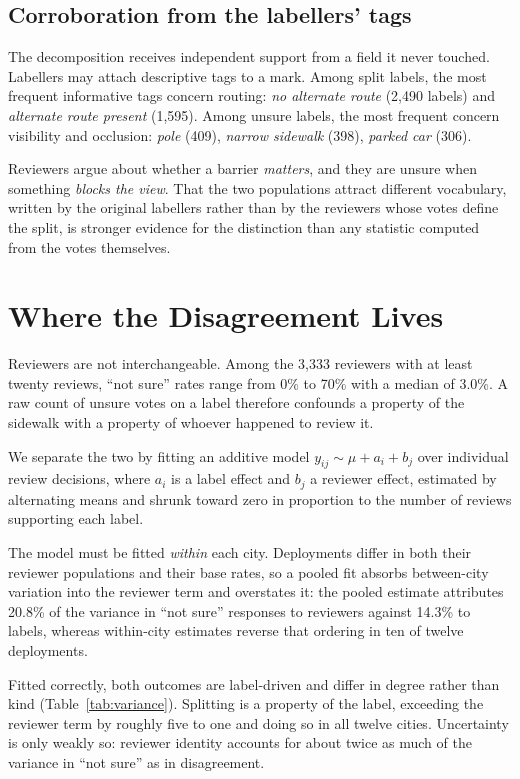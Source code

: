 \documentclass[sigconf]{acmart}
\begin{document}
\subsection{Corroboration from the labellers' tags}

The decomposition receives independent support from a field it never touched.
Labellers may attach descriptive tags to a mark. Among split labels, the most
frequent informative tags concern routing: \emph{no alternate route} (2{,}490
labels) and \emph{alternate route present} (1{,}595). Among unsure labels, the
most frequent concern visibility and occlusion: \emph{pole} (409),
\emph{narrow sidewalk} (398), \emph{parked car} (306).

Reviewers argue about whether a barrier \emph{matters}, and they are unsure when
something \emph{blocks the view}. That the two populations attract different
vocabulary, written by the original labellers rather than by the reviewers whose
votes define the split, is stronger evidence for the distinction than any
statistic computed from the votes themselves.

\section{Where the Disagreement Lives}
\label{sec:where}

Reviewers are not interchangeable. Among the 3{,}333 reviewers with at least
twenty reviews, ``not sure'' rates range from 0\% to 70\% with a median of
3.0\%. A raw count of unsure votes on a label therefore confounds a property of
the sidewalk with a property of whoever happened to review it.

We separate the two by fitting an additive model
$y_{ij} \sim \mu + a_i + b_j$ over individual review decisions, where $a_i$ is a
label effect and $b_j$ a reviewer effect, estimated by alternating means and
shrunk toward zero in proportion to the number of reviews supporting each label.

The model must be fitted \emph{within} each city. Deployments differ in both
their reviewer populations and their base rates, so a pooled fit absorbs
between-city variation into the reviewer term and overstates it: the pooled
estimate attributes 20.8\% of the variance in ``not sure'' responses to
reviewers against 14.3\% to labels, whereas within-city estimates reverse that
ordering in ten of twelve deployments.

Fitted correctly, both outcomes are label-driven and differ in degree rather
than kind (Table~\ref{tab:variance}). Splitting is a property of the label,
exceeding the reviewer term by roughly five to one and doing so in all twelve
cities. Uncertainty is only weakly so: reviewer identity accounts for about
twice as much of the variance in ``not sure'' as in disagreement.
\end{document}
